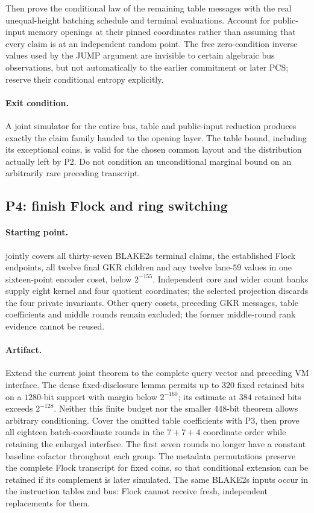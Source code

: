Then prove the conditional law of the remaining table messages with the real unequal-height batching schedule and terminal evaluations. Account for public-input memory openings at their pinned coordinates rather than assuming that every claim is at an independent random point. The free zero-condition inverse values used by the JUMP argument are invisible to certain algebraic bus observations, but not automatically to the earlier commitment or later PCS; reserve their conditional entropy explicitly.

\paragraph{Exit condition.} A joint simulator for the entire bus, table and public-input reduction produces exactly the claim family handed to the opening layer. The table bound, including its exceptional coins, is valid for the chosen common layout and the distribution actually left by P2. Do not condition an unconditional marginal bound on an arbitrarily rare preceding transcript.

\subsection{P4: finish Flock and ring switching}

\paragraph{Starting point.}  jointly covers all thirty-seven BLAKE2s terminal claims, the established Flock endpoints, all twelve final GKR children and any twelve lane-$59$ values in one sixteen-point encoder coset, below $2^{-155}$. Independent core and wider count banks supply eight kernel and four quotient coordinates; the selected projection discards the four private invariants. Other query cosets, preceding GKR messages, table coefficients and middle rounds remain excluded; the former middle-round rank evidence cannot be reused.

\paragraph{Artifact.} Extend the current joint theorem to the complete query vector and preceding VM interface. The dense fixed-disclosure lemma permits up to $320$ fixed retained bits on a $1280$-bit support with margin below $2^{-160}$; its estimate at $384$ retained bits exceeds $2^{-128}$. Neither this finite budget nor the smaller $448$-bit theorem allows arbitrary conditioning. Cover the omitted table coefficients with P3, then prove all eighteen batch-coordinate rounds in the $7+7+4$ coordinate order while retaining the enlarged interface. The first seven rounds no longer have a constant baseline cofactor throughout each group. The metadata permutations preserve the complete Flock transcript for fixed coins, so that conditional extension can be retained if its complement is later simulated. The same BLAKE2s inputs occur in the instruction tables and bus: Flock cannot receive fresh, independent replacements for them.

